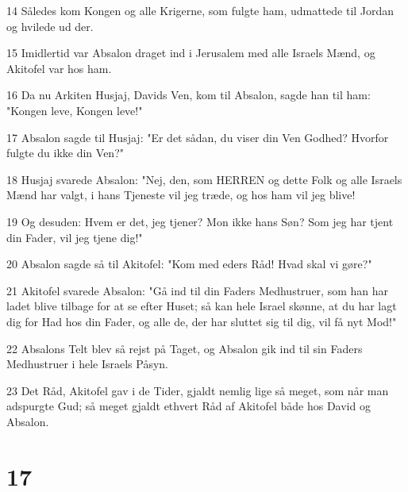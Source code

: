 \par 14 Således kom Kongen og alle Krigerne, som fulgte ham, udmattede til Jordan og hvilede ud der.
\par 15 Imidlertid var Absalon draget ind i Jerusalem med alle Israels Mænd, og Akitofel var hos ham.
\par 16 Da nu Arkiten Husjaj, Davids Ven, kom til Absalon, sagde han til ham: "Kongen leve, Kongen leve!"
\par 17 Absalon sagde til Husjaj: "Er det sådan, du viser din Ven Godhed? Hvorfor fulgte du ikke din Ven?"
\par 18 Husjaj svarede Absalon: "Nej, den, som HERREN og dette Folk og alle Israels Mænd har valgt, i hans Tjeneste vil jeg træde, og hos ham vil jeg blive!
\par 19 Og desuden: Hvem er det, jeg tjener? Mon ikke hans Søn? Som jeg har tjent din Fader, vil jeg tjene dig!"
\par 20 Absalon sagde så til Akitofel: "Kom med eders Råd! Hvad skal vi gøre?"
\par 21 Akitofel svarede Absalon: "Gå ind til din Faders Medhustruer, som han har ladet blive tilbage for at se efter Huset; så kan hele Israel skønne, at du har lagt dig for Had hos din Fader, og alle de, der har sluttet sig til dig, vil få nyt Mod!"
\par 22 Absalons Telt blev så rejst på Taget, og Absalon gik ind til sin Faders Medhustruer i hele Israels Påsyn.
\par 23 Det Råd, Akitofel gav i de Tider, gjaldt nemlig lige så meget, som når man adspurgte Gud; så meget gjaldt ethvert Råd af Akitofel både hos David og Absalon.

\chapter{17}

